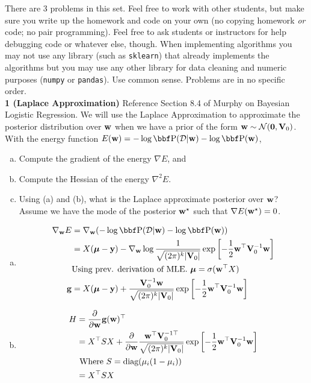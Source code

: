 \documentclass[12pt,letterpaper,fleqn]{hmcpset}
\begin{document}
There are 3 problems in this set.
Feel free to work with other students, but make sure you write up the homework
and code on your own (no copying homework \textit{or} code; no pair programming).
Feel free to ask students or instructors for help debugging code or whatever else,
though.
When implementing algorithms you may not use any library (such as \texttt{sklearn})
that already implements the algorithms but you may use any other library for
data cleaning and numeric purposes (\texttt{numpy} or \texttt{pandas}). Use common
sense. Problems are in no specific order.\\[1em]

\textbf{1 (Laplace Approximation)} Reference Section 8.4 of Murphy on Bayesian Logistic Regression. We will
use the Laplace Approximation to approximate the posterior distribution over
${\bf w}$ when we have a prior of the form ${\bf w} \sim {\cal N}({\bf 0}, {\bf V}_0)$. With the energy
function $E(\ww) = -\log\PP(\Dc|\ww) - \log\PP(\ww)$,
\begin{enumerate}[(a)]
    \item Compute the gradient of the energy $\nabla E$, and
    \item Compute the Hessian of the energy $\nabla^2 E$.
    \item Using (a) and (b), what is the Laplace approximate posterior over
        ${\bf w}$? Assume we have the mode of the posterior ${\bf w}^\star$ such
        that $\nabla E({\bf w}^\star) = 0$.
\end{enumerate}
    \begin{enumerate}[(a)]
        \item
            \begin{align*}
                 \nabla_\ww E &= \nabla_\ww (-\log\PP(\Dc|\ww) - \log\PP(\ww)) \\
                 &=  X(\mub-\yy) - \nabla_\ww\log \frac{1}{\sqrt{(2\pi)^k|\Vb_0|}} \exp \left[-\frac12 \ww^\T \Vb_0^{-1} \ww \right]\\ &\text{Using prev. derivation of MLE. $\mub = \sigma(\ww^\T X)$}\\
                 \gg &= X(\mub-\yy) +  \frac{\Vb_0^{-1} \ww}{\sqrt{(2\pi)^k|\Vb_0|}} \exp \left[-\frac12 \ww^\T \Vb_0^{-1} \ww \right]\\
             \end{align*} 
        \item
           \begin{align*}
                H &= \frac\partial{\partial {\bf w}} {\bf g}({\bf w})^\top \\
                &=  X^\top S X + \frac\partial{\partial {\bf w}} \frac{ {\bf w}^\top {\bf V}_0^{-1\top} }{\sqrt{(2\pi)^k|{\bf V}_0|}} \exp \left[-\frac12 {\bf w}^\top {\bf V}_0^{-1} {\bf w} \right]\\
                & \text{ Where $S = {\hbox{diag}}(\mu_i(1-\mu_i))$} \\
                &= X^\top S X 
            \end{align*} 
    \end{enumerate}
\begin{solution}
    
\end{solution}
\end{document}
